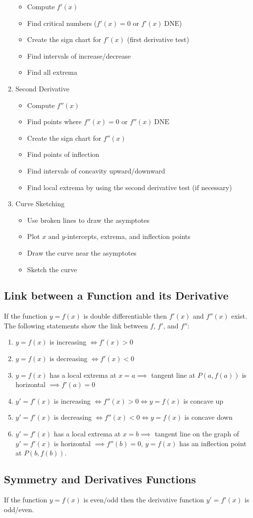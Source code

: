 \begin{enumerate}
			\begin{itemize}
				\item Compute $f'(x)$
				\item Find critical numbers ($f'(x) = 0$ or $f'(x)\ \mathrm{DNE}$)
				\item Create the sign chart for $f'(x)$ (first derivative test)
				\item Find intervals of increase/decrease
				\item Find all extrema
			\end{itemize}
		\item Second Derivative
			\begin{itemize}
				\item Compute $f''(x)$
				\item Find points where $f''(x) = 0$ or $f''(x)\ \mathrm{DNE}$
				\item Create the sign chart for $f''(x)$
				\item Find points of inflection
				\item Find intervals of concavity upward/downward
				\item Find local extrema by using the second derivative test (if necessary)
			\end{itemize}
		\item Curve Sketching
			\begin{itemize}
				\item Use broken lines to draw the asymptotes
				\item Plot $x$ and $y$-intercepts, extrema, and inflection points
				\item Draw the curve near the asymptotes
				\item Sketch the curve
			\end{itemize}
	\end{enumerate}
\subsection{Link between a Function and its Derivative}
	If the function $y = f(x)$ is double differentiable then $f'(x)$ and $f''(x)$ exist.
	The following statements show the link between $f$, $f'$, and $f''$:
	\begin{enumerate}
		\item $y=f(x)$ is increasing $\iff f'(x) > 0$
		\item $y=f(x)$ is decreasing $\iff f'(x) < 0$
		\item $y=f(x)$ has a local extrema at $x=a \implies$ tangent line at $P(a,f(a))$ is horizontal $\implies f'(a) = 0$
		\item $y'=f'(x)$ is increasing $\iff f''(x) > 0 \iff y = f(x)$ is concave up
		\item $y'=f'(x)$ is decreasing $\iff f''(x) < 0 \iff y=f(x)$ is concave down
		\item $y'=f'(x)$ has a local extrema at $x=b \implies$ tangent line on the graph of $y'=f'(x)$ is horizontal $\implies f''(b) = 0$, $y=f(x)$ has an inflection point at $P(b,f(b))$.
	\end{enumerate}
\subsection{Symmetry and Derivatives Functions}
	If the function $y=f(x)$ is even/odd then the derivative function $y'=f'(x)$ is odd/even.
